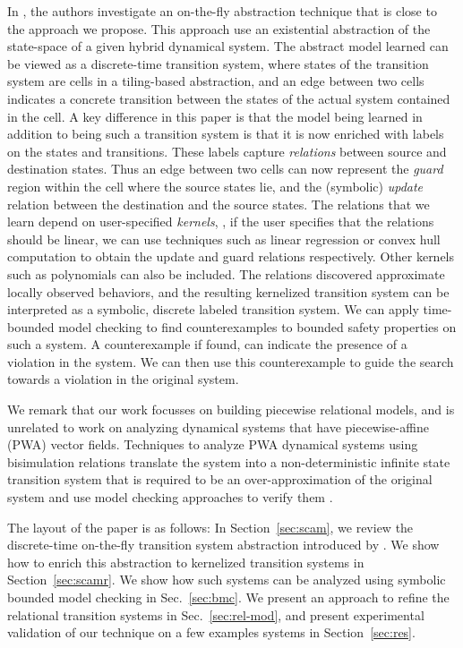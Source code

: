 In \cite{zutshi2014multiple}, the authors investigate an on-the-fly
abstraction technique that is close to the approach we propose.  This
approach use an existential abstraction of the state-space of a given
hybrid dynamical system. The abstract model learned can be viewed as a
discrete-time transition system, where states of the transition system
are cells in a tiling-based abstraction, and an edge between two cells
indicates a concrete transition between the states of the actual
system contained in the cell.  A key difference in this paper is that
the model being learned in addition to being such a transition system
is that it is now enriched with labels on the states and transitions.
These labels capture {\em relations} between source and destination
states. Thus an edge between two cells can now represent the {\em
guard} region within the cell where the source states lie, and the
(symbolic) {\em update} relation between the destination and the
source states.  The relations that we learn depend on user-specified
{\em kernels}, \ie, if the user specifies that the relations should be
linear, we can use techniques such as linear regression or convex hull
computation to obtain the update and guard relations respectively.
Other kernels such as polynomials can also be included.  The relations
discovered approximate locally observed behaviors, and the resulting
kernelized transition system can be interpreted as a symbolic,
discrete labeled transition system. We can apply time-bounded model
checking to find counterexamples to bounded safety properties on such
a system. A counterexample if found, can indicate the presence of a
violation in the system.  We can then use this counterexample to guide
the search towards a violation in the original system. 

We remark that our work focusses on building piecewise relational
models, and is unrelated to work on analyzing dynamical systems that
have piecewise-affine (PWA) vector fields. Techniques to analyze PWA
dynamical systems using bisimulation relations translate the system
into a non-deterministic infinite state transition system that is
required to be an over-approximation of the original system and use
model checking approaches to verify them \cite{asarin2000approximate}.


The layout of the paper is as follows: In Section~\ref{sec:scam}, we
review the discrete-time on-the-fly transition system abstraction
introduced by \cite{zutshi2014multiple}.  We show how to enrich this
abstraction to kernelized transition systems in
Section~\ref{sec:scamr}.  We show how such systems can be analyzed
using symbolic bounded model checking in Sec.~\ref{sec:bmc}.  We
present an approach to refine the relational transition systems in
Sec.~\ref{sec:rel-mod}, and present experimental validation of our
technique on a few examples systems in Section~\ref{sec:res}.
